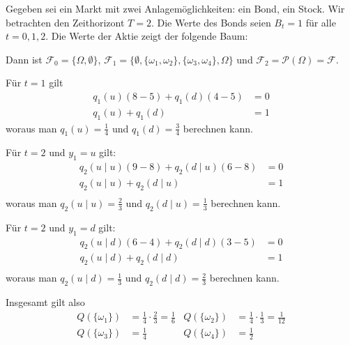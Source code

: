 \documentclass[a4paper,twoside,DIV15,BCOR12mm]{scrbook}
\newcommand{\cF}{\mathcal F}
\begin{document}
\begin{beispiel}
Gegeben sei ein Markt mit zwei Anlagemöglichkeiten: ein Bond, ein Stock. Wir betrachten den Zeithorizont $T=2$. Die Werte des Bonds seien $B_t=1$ für alle $t=0,1,2$. Die Werte der Aktie zeigt der folgende Baum:
\begin{center}
\end{center}

Dann ist $\cF_0=\{\Omega,\emptyset\}$, $\cF_1=\{\emptyset,\{\omega_1,\omega_2\}, \{\omega_3,\omega_4\},\Omega\}$ und $\cF_2=\mathcal P(\Omega)=\cF$.

Für $t=1$ gilt
\begin{align*}
q_1(u)(8-5) + q_1(d) (4-5) &= 0 \\
q_1(u) + q_1(d) &= 1
\end{align*}
woraus man $q_1(u) = \frac14$ und $q_1(d)=\frac34$ berechnen kann.

Für $t=2$ und $y_1=u$ gilt:
\begin{align*}
q_2(u\mid u) (9-8) + q_2(d\mid u)(6-8) &= 0  \\
q_2(u\mid u)  + q_2(d\mid u) &= 1  \\
\end{align*}
woraus man $q_2(u\mid u) = \frac23$ und $q_2(d\mid u) = \frac 13$ berechnen kann.

Für $t=2$ und $y_1=d$ gilt:
\begin{align*}
q_2(u\mid d) (6-4) + q_2(d\mid d)(3-5) &= 0  \\
q_2(u\mid d)  + q_2(d\mid d) &= 1  \\
\end{align*}
woraus man $q_2(u\mid d) = \frac13$ und $q_2(d\mid d) = \frac 23$ berechnen kann.

Insgesamt gilt also
\begin{align*}
Q(\{\omega_1\}) &= \frac 14 \cdot \frac 23 = \frac 16 & Q(\{\omega_2\}) &= \frac14\cdot\frac 13 = \frac 1{12} \\
Q(\{\omega_3\}) &= \frac 14 & Q(\{\omega_4\}) &= \frac 1{2} 
\end{align*}
\end{beispiel}
\end{document}
